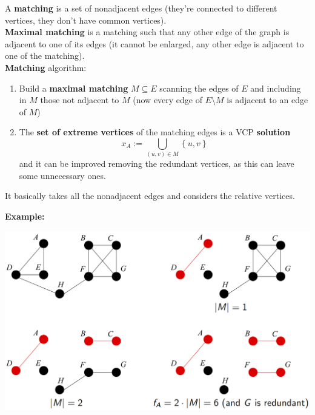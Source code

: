 A \textbf{matching} is a set of nonadjacent edges (they're connected to different vertices, they don't have common vertices).\\
\textbf{Maximal matching} is a matching such that any other edge of the graph is adjacent to one of its edges (it cannot be enlarged, any other edge is adjacent to one of the matching).\\

\textbf{Matching} algorithm:
\begin{enumerate}
	\item Build a \textbf{maximal matching} $M \subseteq E$ scanning the edges of $E$ and including in $M$ those not adjacent to $M$ (now every edge of $E \setminus M$ is adjacent to an edge of $M$)
	\item The \textbf{set of extreme vertices} of the matching edges is a VCP \textbf{solution}
	$$ x_A := \bigcup_{(u,v) \in M} \left\{u,v\right\}$$
	and it can be improved removing the redundant vertices, as this can leave some unnecessary ones.
\end{enumerate}
It basically takes all the nonadjacent edges and considers the relative vertices.\\

\newpage

\textbf{Example:}
\begin{center}
	\includegraphics[width=\columnwidth]{img/VCP2Approx}
\end{center}


